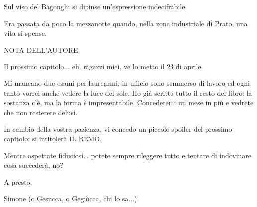 Sul viso del Bagonghi si dipinse un'espressione indecifrabile.

Era passata da poco la mezzanotte quando, nella zona industriale di Prato, una vita si spense.


NOTA DELL'AUTORE

Il prossimo capitolo... eh, ragazzi miei, ve lo metto il 23 di aprile.

Mi mancano due esami per laurearmi, in ufficio sono sommerso di lavoro ed ogni tanto vorrei anche vedere la luce del sole. Ho già scritto tutto il resto del libro: la sostanza c'è, ma la forma è impresentabile. Concedetemi un mese in più e vedrete che non resterete delusi.

In cambio della vostra pazienza, vi concedo un piccolo spoiler del prossimo capitolo: si intitolerà IL REMO.

Mentre aspettate fiduciosi... potete sempre rileggere tutto e tentare di indovinare cosa succederà, no?

A presto,

Simone (o Gesucca, o Gegiùcca, chi lo sa...)



